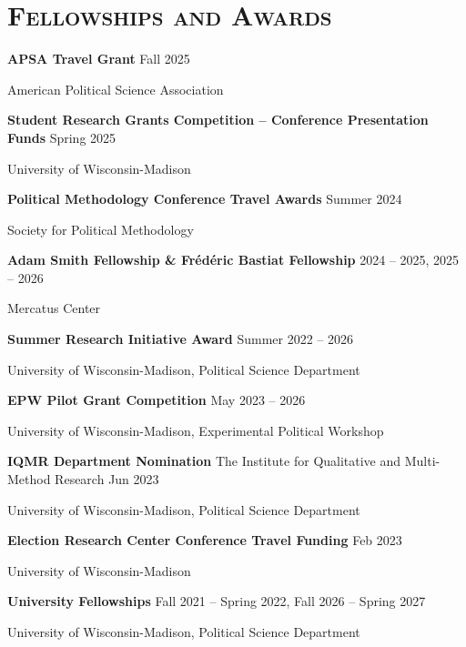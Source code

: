 \documentclass[11pt, letterpaper]{article}
\begin{document}
\vspace{-4mm}
\section*{\textsc{Fellowships and Awards}} 

\vspace{-1.5mm}
\textbf{APSA Travel Grant} \hfill Fall 2025

American Political Science Association

\vspace{1mm}
\textbf{Student Research Grants Competition -- Conference Presentation Funds} \hfill Spring 2025

University of Wisconsin-Madison 

\vspace{1mm}
\textbf{Political Methodology Conference Travel Awards} \hfill Summer 2024

Society for Political Methodology 

\vspace{1mm}
\textbf{Adam Smith Fellowship \& Frédéric Bastiat Fellowship} \hfill 2024 -- 2025, 2025 -- 2026

Mercatus Center


\textbf{Summer Research Initiative Award} \hfill Summer 2022 -- 2026

University of Wisconsin-Madison, Political Science Department 


\vspace{1mm}
\textbf{EPW Pilot Grant Competition} \hfill May 2023 -- 2026

University of Wisconsin-Madison, Experimental Political Workshop 

\vspace{1mm}
\textbf{IQMR Department Nomination} The Institute for Qualitative and Multi-Method Research \hfill Jun 2023

University of Wisconsin-Madison, Political Science Department

\vspace{1mm}
\textbf{Election Research Center Conference Travel Funding} \hfill Feb 2023

University of Wisconsin-Madison

\vspace{1mm}
\textbf{University Fellowships} \hfill Fall 2021 -- Spring 2022, Fall 2026 -- Spring 2027

University of Wisconsin-Madison, Political Science Department


\vspace{-3mm}
\end{document}
